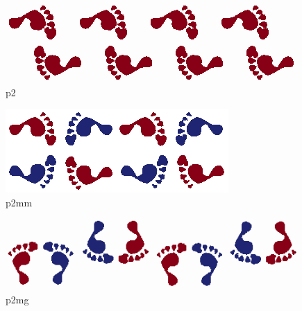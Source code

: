 \documentclass[class=article, crop=false]{standalone}
\begin{document}
    \vfill
    \begin{subfigure}{0.21\linewidth}
            \centering
	        \includegraphics[width=\linewidth,angle=90]{images/frieze-groups/Frieze_spinning_hop.png}
	        \caption{p2}
	        \label{fig:p2}
    \end{subfigure}
    \begin{subfigure}{0.21\linewidth}
            \centering
	        \includegraphics[width=\linewidth,angle=90]{images/frieze-groups/Frieze_spinning_jump.png}
	        \caption{p2mm}
	        \label{fig:p2mm}
    \end{subfigure}
    \begin{subfigure}{0.21\linewidth}
            \centering
	        \includegraphics[width=\linewidth,angle=90]{images/frieze-groups/Frieze_spinning_sidle.png}
	        \caption{p2mg}
	        \label{fig:subfigC}
    \end{subfigure}
\end{document}
